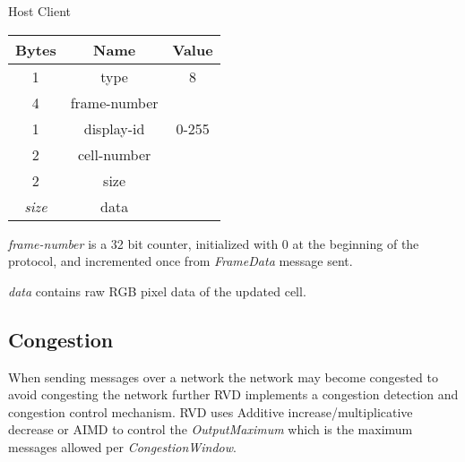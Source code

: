 \begin{center}
    Host \textrightarrow Client\\
    \begin{tabular}{|c|c|c|}
        \hline
        \textbf{Bytes} & \textbf{Name} & \textbf{Value} \\
        \hline
        1              & type          & 8             \\
        \hline
        4              & frame-number  &                \\
        \hline
        1              & display-id    & 0-255          \\
        \hline
        2              & cell-number   &                \\
        \hline
        2              & size          &                \\
        \hline
        \emph{size}    & data          &                \\
        \hline
    \end{tabular}
\end{center}

\emph{frame-number} is a 32 bit counter, initialized with 0 at the beginning of the protocol, and incremented once
from \emph{FrameData} message sent.

\emph{data} contains raw RGB pixel data of the updated cell.

\subsection{Congestion}

When sending messages over a network the network may become congested to avoid congesting the network further RVD
implements a congestion detection and congestion control mechanism. RVD uses Additive increase/multiplicative
decrease or AIMD to control the \emph{OutputMaximum} which is the maximum messages allowed per
\emph{CongestionWindow}.